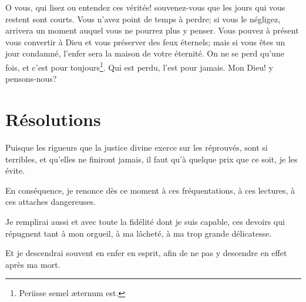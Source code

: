 \documentclass[instructions.tex]{subfiles}
\begin{document}
O vous, qui lisez ou entendez ces vérités! souvenez-vous que les jours qui vous restent sont courts. Vous n’avez point de temps à perdre; si vous le négligez, arrivera un moment auquel vous ne pourrez plus y penser. Vous pouvez à présent vous convertir à Dieu et vous préserver des feux éternels; mais si vous êtes un jour condamné, l’enfer sera la maison de votre éternité. On ne se perd qu’une fois, et c’est pour toujours\footnote{Periisse semel æternum est.}. Qui est perdu, l’est pour jamais. Mon Dieu! y pensons-nous?
 
\section{Résolutions}
 
\primo Puisque les rigueurs que la justice divine exerce sur les réprouvés, sont si terribles, et qu’elles ne finiront jamais, il faut qu’à quelque prix que ce soit, je les évite.
 
\secundo En conséquence, je renonce dès ce moment à ces fréquentations, à ces lectures, à ces attaches dangereuses.
 
\tertio Je remplirai aussi et avec toute la fidélité dont je suis capable, ces devoirs qui répugnent tant à mon orgueil, à ma lâcheté, à ma trop grande délicatesse.
 
\quarto Et je descendrai souvent en enfer en esprit, afin de ne pas y descendre en effet après ma mort. 

 
\end{document}
